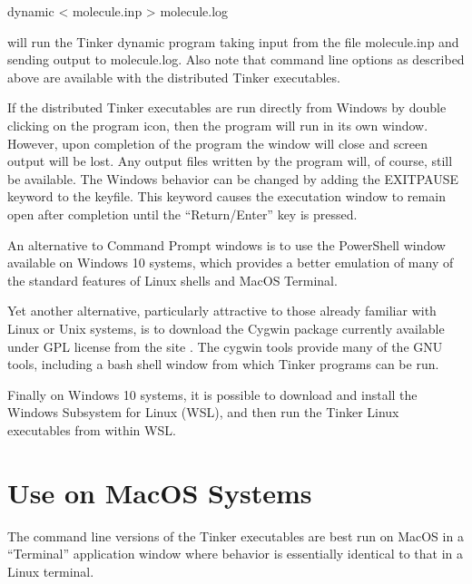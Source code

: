 \documentclass[letterpaper,11pt,english]{sphinxmanual}
\begin{document}
dynamic \textless{} molecule.inp \textgreater{} molecule.log

will run the Tinker dynamic program taking input from the file molecule.inp and sending output to molecule.log. Also note that command line options as described above are available with the distributed Tinker executables.

If the distributed Tinker executables are run directly from Windows by double clicking on the program icon, then the program will run in its own window. However, upon completion of the program the window will close and screen output will be lost. Any output files written by the program will, of course, still be available. The Windows behavior can be changed by adding the EXIT\sphinxhyphen{}PAUSE keyword to the keyfile. This keyword causes the executation window to remain open after completion until the “Return/Enter” key is pressed.

An alternative to Command Prompt windows is to use the PowerShell window available on Windows 10 systems, which provides a better emulation of many of the standard features of Linux shells and MacOS Terminal.

Yet another alternative, particularly attractive to those already familiar with Linux or Unix systems, is to download the Cygwin package currently available under GPL license from the site . The cygwin tools provide many of the GNU tools, including a bash shell window from which Tinker programs can be run.

Finally on Windows 10 systems, it is possible to download and install the Windows Subsystem for Linux (WSL), and then run the Tinker Linux executables from within WSL.


\section{Use on MacOS Systems}
\label{\detokenize{text/special-features:use-on-macos-systems}}
The command line versions of the Tinker executables are best run on MacOS in a “Terminal” application window where behavior is essentially identical to that in a Linux terminal.
\end{document}
